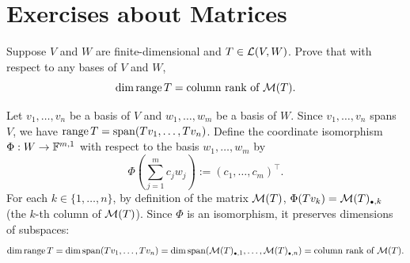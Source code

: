 \section*{Exercises about Matrices}

\begin{xrcs}
  Suppose $V$ and $W$ are finite-dimensional and $T \in \mathcal{L}(V,W)$. Prove that with respect to any bases of $V$ and $W$,
  \begin{equation}
    \dim \operatorname{range} T = \text{column rank of } \mathcal{M}(T).
  \end{equation}

  \begin{xprf}
    Let $v_1, \dots, v_n$ be a basis of $V$ and $w_1, \dots, w_m$ be a basis of $W$.
    Since $v_1, \dots, v_n$ spans $V$, we have $\operatorname{range} T = \operatorname{span} (Tv_1, \dots, Tv_n)$.
    Define the coordinate isomorphism $\Phi : W \to \mathbb{F}^{m,1}$ with respect to the basis $w_1, \dots, w_m$ by
    \begin{equation}
      \Phi\left(\sum_{j=1}^m c_j w_j\right) := (c_1, \dots, c_m)^\top.
    \end{equation}
    For each $k \in \{1, \dots, n\}$, by definition of the matrix $\mathcal{M}(T)$, $\Phi(Tv_k) = \mmatrix(T)_{\mathsmaller{\bullet}, k}$ (the $k$-th column of $\mathcal{M}(T)$).
    Since $\Phi$ is an isomorphism, it preserves dimensions of subspaces:
    \begin{equation}
      \dim \myrange T = \dim \myspan{Tv_1, \dots, Tv_n} = \dim \myspan{\mmatrix(T)_{\mathsmaller{\bullet}, 1}, \dots, \mmatrix(T)_{\mathsmaller{\bullet}, n}} = \text{column rank of } \mmatrix(T).
    \end{equation}
  \end{xprf}
\end{xrcs}

